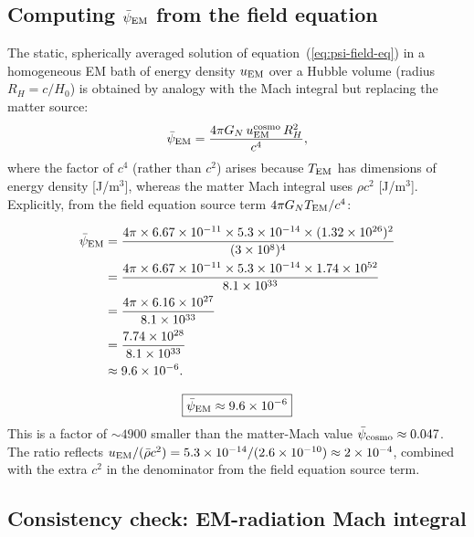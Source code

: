\documentclass[11pt]{article}
\newcommand{\ee}[1]{\times 10^{#1}}
\newcommand{\psicosmo}{\bar{\psi}_{\rm cosmo}}
\newcommand{\psiEM}{\bar{\psi}_{\rm EM}}
\newcommand{\GN}{G_N}
\newcommand{\Hzero}{H_0}
\begin{document}
\subsection{Computing $\psiEM$ from the field equation}

The static, spherically averaged solution of equation~(\ref{eq:psi-field-eq})
in a homogeneous EM bath of energy density $u_{\rm EM}$ over a Hubble volume
(radius $R_H = c/\Hzero$) is obtained by analogy with the Mach integral
but replacing the matter source:
\begin{equation}\label{eq:psi-EM-def}
  \psiEM = \frac{4\pi \GN\,u_{\rm EM}^{\rm cosmo}\,R_H^2}{c^4},
\end{equation}
where the factor of $c^4$ (rather than $c^2$) arises because $T_{\rm EM}$
has dimensions of energy density [J/m$^3$], whereas the matter Mach integral
uses $\rho c^2$ [J/m$^3$]. Explicitly, from the field equation source term
$4\pi \GN T_{\rm EM}/c^4$:

\begin{align}\label{eq:psi-EM-numerical}
  \psiEM &= \frac{4\pi \times 6.67\ee{-11}\times 5.3\ee{-14}\times
    (1.32\ee{26})^2}{(3\ee{8})^4} \nonumber\\
  &= \frac{4\pi \times 6.67\ee{-11}\times 5.3\ee{-14}\times 1.74\ee{52}}
    {8.1\ee{33}} \nonumber\\
  &= \frac{4\pi \times 6.16\ee{27}}{8.1\ee{33}} \nonumber\\
  &= \frac{7.74\ee{28}}{8.1\ee{33}} \nonumber\\
  &\approx 9.6\ee{-6}.
\end{align}

\begin{tcolorbox}[colback=green!5!white, colframe=green!60!black,
  title=\textbf{Key Result: EM-Only $\psi$-Background}]
\begin{equation}
\boxed{\psiEM \approx 9.6\ee{-6}}
\end{equation}
This is a factor of $\sim 4900$ smaller than the matter-Mach value
$\psicosmo \approx 0.047$. The ratio reflects $u_{\rm EM}/(\bar\rho c^2)
= 5.3\ee{-14}/(2.6\ee{-10}) \approx 2\ee{-4}$, combined with
the extra $c^2$ in the denominator from the field equation source term.
\end{tcolorbox}

\subsection{Consistency check: EM-radiation Mach integral}
\end{document}
